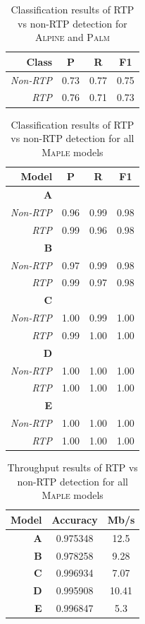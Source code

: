 \begin{table} [h!]
\centering
\begin{tabular}{| r | c | c | c |}
\hline
Class & P & R & F1 \\
\hline
\textit{Non-RTP} & 0.73 & 0.77 & 0.75 \\
\textit{RTP} & 0.76 & 0.71 & 0.73 \\
\hline
\end{tabular}
\caption{Classification results of RTP vs non-RTP detection for \textsc{Alpine} and \textsc{Palm}}
\label{tab:rtpresultslsh}
\end{table}

\begin{table} [h!]
\centering
\small
\begin{tabular}{| r | c | c | c |}
\hline
Model & P & R & F1 \\
\hline
\textbf{A} &&& \\
\textit{Non-RTP} & 0.96 & 0.99 & 0.98 \\
\textit{RTP} & 0.99 & 0.96 & 0.98 \\
\hline
\textbf{B} &&& \\
\textit{Non-RTP} & 0.97 & 0.99 & 0.98 \\
\textit{RTP} & 0.99 & 0.97 & 0.98 \\
\hline
\textbf{C} &&& \\
\textit{Non-RTP} & 1.00 & 0.99 & 1.00 \\
\textit{RTP} & 0.99 & 1.00 & 1.00 \\
\hline
\textbf{D} &&& \\
\textit{Non-RTP} & 1.00 & 1.00 & 1.00 \\
\textit{RTP} & 1.00 & 1.00 & 1.00 \\
\hline
\textbf{E} &&& \\
\textit{Non-RTP} & 1.00 & 1.00 & 1.00 \\
\textit{RTP} & 1.00 & 1.00 & 1.00 \\
\hline
\end{tabular}
\caption{Classification results of RTP vs non-RTP detection for all \textsc{Maple} models}
\label{tab:binaryresults}
\end{table}

\begin{table}
\centering
\small
\begin{tabular}{| r | c | c |}
\hline
Model & Accuracy & Mb/s \\
\hline
\textbf{A} & 0.975348 & 12.5 \\
\hline
\textbf{B} & 0.978258 & 9.28 \\
\hline
\textbf{C} & 0.996934 & 7.07 \\
\hline
\textbf{D} & 0.995908 & 10.41 \\
\hline
\textbf{E} & 0.996847 & 5.3 \\
\hline
\end{tabular}
\caption{Throughput results of RTP vs non-RTP detection for all \textsc{Maple} models}
\label{tab:binarythroughput}
\end{table}

